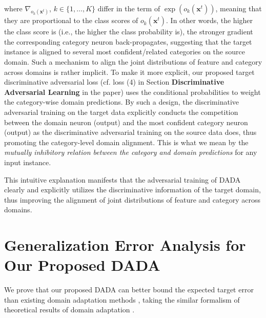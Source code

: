\documentclass[letterpaper]{article} \usepackage{aaai20}  \usepackage{times}  \usepackage{helvet} \usepackage{courier}  \usepackage[hyphens]{url}  \usepackage{graphicx} \urlstyle{rm} \def\UrlFont{\rm}  \usepackage{graphicx}  \frenchspacing  \setlength{\pdfpagewidth}{8.5in}  \setlength{\pdfpageheight}{11in}
\begin{document}
where $\nabla_{o_k(\mathbf{x}^t)}$, $k \in \{1, \dots, K\}$ differ in the term of $\exp(o_k(\mathbf{x}^t))$, meaning that they are proportional to the class scores of $o_k(\mathbf{x}^t)$. In other words, the higher the class score is (i.e., the higher the class probability is), the stronger gradient the corresponding category neuron back-propagates, suggesting that the target instance is aligned to several most confident/related categories on the source domain. Such a mechanism to align the joint distributions of feature and category across domains is rather implicit. To make it more explicit, our proposed target discriminative adversarial loss (cf. loss (4) in Section \textbf{Discriminative Adversarial Learning} in the paper) uses the conditional probabilities to weight the category-wise domain predictions. By such a design, the discriminative adversarial training on the target data explicitly conducts the competition between the domain neuron (output) and the most confident category neuron (output) as the discriminative adversarial training on the source data does, thus promoting the category-level domain alignment. This is what we mean by the \emph{mutually inhibitory relation between the category and domain predictions} for any input instance.

This intuitive explanation manifests that the adversarial training of DADA clearly and explicitly utilizes the discriminative information of the target domain, thus improving the alignment of joint distributions of feature and category across domains. 

\section{Generalization Error Analysis for Our Proposed DADA}
\label{sec3}
We prove that our proposed DADA can better bound the expected target error than existing domain adaptation methods \cite{dann,adda,mada,SimNet,iCAN,dirt_t,cdan,tada,hla,dann_ca}, taking the similar formalism of theoretical results of domain adaptation \cite{da_theory1,da_theory2}.
\end{document}
